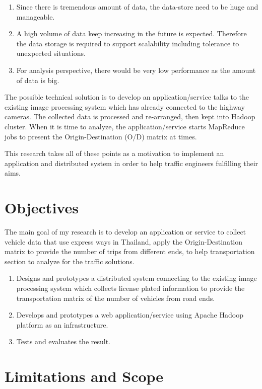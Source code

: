 \begin{enumerate}
	\item Since there is tremendous amount of data, the data-store need to be huge and manageable.
	\item A high volume of data keep increasing in the future is expected. Therefore the data storage is required to support scalability including tolerance to unexpected situations.
	\item For analysis perspective, there would be very low performance as the amount of data is big.
\end{enumerate}

The possible technical solution is to develop an application/service talks to the existing image processing system which has already connected to the highway cameras. The collected data is processed and re-arranged, then kept into Hadoop cluster. When it is time to analyze, the application/service starts MapReduce jobs to present the Origin-Destination (O/D) matrix at times. 

This research takes all of these points as a motivation to implement an application and distributed system in order to help traffic engineers fulfilling their aims.

\section{Objectives}
The main goal of my research is to develop an application or service to collect vehicle data that use express ways in Thailand, apply the Origin-Destination matrix to provide the number of trips from different ends, to help transportation section to analyze for the traffic solutions.

\begin{enumerate}
	\item Designs and prototypes a distributed system connecting to the existing image processing system which collects license plated information to provide the transportation matrix of the number of vehicles from road ends.
	\item Develops and prototypes a web application/service using Apache Hadoop platform as an infrastructure.
	\item Tests and evaluates the result.
\end{enumerate}

\section{Limitations and Scope}


